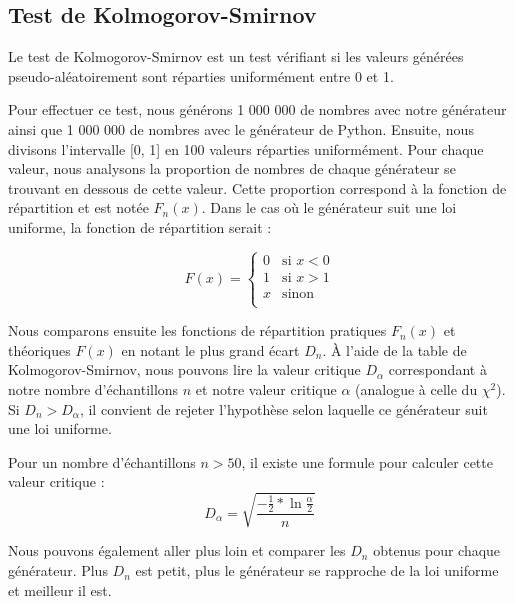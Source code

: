 \documentclass[10pt,a4paper]{article}
\begin{document}
	\newpage
	\subsection{Test de Kolmogorov-Smirnov}
	Le test de Kolmogorov-Smirnov est un test vérifiant si les valeurs générées pseudo-aléatoirement sont réparties uniformément entre 0 et 1.
	
	Pour effectuer ce test, nous générons 1 000 000 de nombres avec notre générateur ainsi que 1 000 000 de nombres avec le générateur de Python.
	Ensuite, nous divisons l'intervalle [0, 1] en 100 valeurs réparties uniformément.
	Pour chaque valeur, nous analysons la proportion de nombres de chaque générateur se trouvant en dessous de cette valeur.
	Cette proportion correspond à la fonction de répartition et est notée $F_n(x)$.
	Dans le cas où le générateur suit une loi uniforme, la fonction de répartition serait :
	
	\begin{equation*}
		F(x) = 
		\begin{cases}
			0 & \text{si } x < 0 \\
			1 & \text{si } x > 1\\
			x & \text{sinon }\\
		\end{cases}
	\end{equation*}
	
	Nous comparons ensuite les fonctions de répartition pratiques $F_n(x)$ et théoriques $F(x)$ en notant le plus grand écart $D_n$. 
	À l'aide de la table de Kolmogorov-Smirnov, nous pouvons lire la valeur critique $D_\alpha$ correspondant à notre nombre d'échantillons $n$ et notre valeur critique $\alpha$ (analogue à celle du $\chi^2$).
	Si $D_n > D_\alpha$, il convient de rejeter l'hypothèse selon laquelle ce générateur suit une loi uniforme.
	
	Pour un nombre d'échantillons $n > 50$, il existe une formule pour calculer cette valeur critique :
	\begin{equation*}
		D_\alpha = \sqrt{
			\frac{
			- \frac{1}{2} * \ln{\frac{\alpha}{2}}
			}{n}
		}
	\end{equation*}
	
	Nous pouvons également aller plus loin et comparer les $D_n$ obtenus pour chaque générateur. Plus $D_n$ est petit, plus le générateur se rapproche de la loi uniforme et meilleur il est.
	
\end{document}
